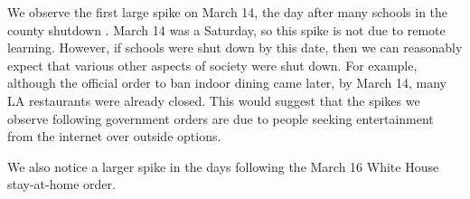 We observe the first large spike on March 14, the day after many schools in the county shutdown \cite{haire2020LA}. March 14 was a Saturday, so this spike is not due to remote learning. However, if schools were shut down by this date, then we can reasonably expect that various other aspects of society were shut down. For example, although the official order to ban indoor dining came later, by March 14, many LA restaurants were already closed\cite{eater2020}. This would suggest that the spikes we observe following government orders are due to people seeking entertainment from the internet over outside options.

We also notice a larger spike in the days following the March 16 White House stay-at-home order. 